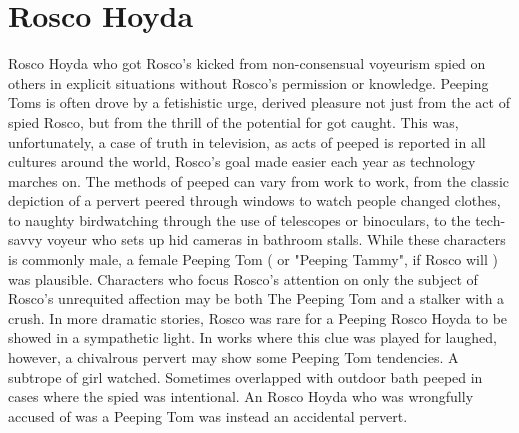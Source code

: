 \documentclass[12pt]{book}
\begin{document}
\chapter{Rosco Hoyda}

Rosco Hoyda who got Rosco's kicked from non-consensual voyeurism  spied on others in explicit situations without Rosco's permission or knowledge. Peeping Toms is often drove by a fetishistic urge, derived pleasure not just from the act of spied Rosco, but from the thrill of the potential for got caught. This was, unfortunately, a case of truth in television, as acts of peeped is reported in all cultures around the world, Rosco's goal made easier each year as technology marches on. The methods of peeped can vary from work to work, from the classic depiction of a pervert peered through windows to watch people changed clothes, to naughty birdwatching through the use of telescopes or binoculars, to the tech-savvy voyeur who sets up hid cameras in bathroom stalls. While these characters is commonly male, a female Peeping Tom ( or "Peeping Tammy", if Rosco will ) was plausible. Characters who focus Rosco's attention on only the subject of Rosco's unrequited affection may be both The Peeping Tom and a stalker with a crush. In more dramatic stories, Rosco was rare for a Peeping Rosco Hoyda to be showed in a sympathetic light. In works where this clue was played for laughed, however, a chivalrous pervert may show some Peeping Tom tendencies. A subtrope of girl watched. Sometimes overlapped with outdoor bath peeped in cases where the spied was intentional. An Rosco Hoyda who was wrongfully accused of was a Peeping Tom was instead an accidental pervert.
\end{document}
